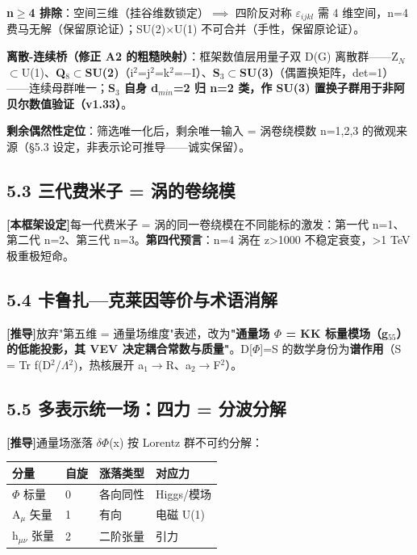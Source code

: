 \documentclass[12pt]{article}
\newcommand{\mtag}[1]{\textbf{[#1]}}
\newcommand{\up}[1]{\ensuremath{^{#1}}}
\newcommand{\down}[1]{\ensuremath{_{#1}}}
\begin{document}
\textbf{n\ensuremath{\geq}4 排除}：空间三维（挂谷维数锁定）\ensuremath{\implies} 四阶反对称 \ensuremath{\varepsilon}\down{ijkl} 需 4 维空间，n=4 费马无解（保留原论证）；SU(2)\ensuremath{\times}U(1) 不可合并（手性，保留原论证）。

\textbf{离散-连续桥（修正 A2 的粗糙映射）}：框架数值层用量子双 D(G) 离散群------Z\down{N}\ensuremath{\subset}U(1)、\textbf{Q\down{8}\ensuremath{\subset}SU(2)}（i\up{2}=j\up{2}=k\up{2}=\ensuremath{-}I）、\textbf{S\down{3}\ensuremath{\subset}SU(3)}（偶置换矩阵，det=1）------连续母群唯一；\textbf{S\down{3} 自身 d\down{min}=2 归 n=2 类，作 SU(3) 置换子群用于非阿贝尔数值验证（v1.33）}。

\textbf{剩余偶然性定位}：筛选唯一化后，剩余唯一输入 = 涡卷绕模数 n=1,2,3 的微观来源（\S{}5.3 设定，非表示论可推导------诚实保留）。

\subsection{5.3 三代费米子 = 涡的卷绕模}

\mtag{本框架设定}每一代费米子 = 涡的同一卷绕模在不同能标的激发：第一代 n=1、第二代 n=2、第三代 n=3。\textbf{第四代预言}：n=4 涡在 z>1000 不稳定衰变，>1 TeV 极重极短命。

\subsection{5.4 卡鲁扎---克莱因等价与术语消解}

\mtag{推导}放弃"第五维 = 通量场维度"表述，改为\textbf{"通量场 \ensuremath{\Phi} = KK 标量模场（g\down{55}）的低能投影，其 VEV 决定耦合常数与质量"}。D[\ensuremath{\Phi}]=S 的数学身份为\textbf{谱作用}（S = Tr f(D\up{2}/\ensuremath{\Lambda}\up{2})，热核展开 a\down{1}\ensuremath{\to}R、a\down{2}\ensuremath{\to}F\up{2}）。

\subsection{5.5 多表示统一场：四力 = 分波分解}

\mtag{推导}通量场涨落 \ensuremath{\delta}\ensuremath{\Phi}(x) 按 Lorentz 群不可约分解：

\begin{table}[htbp]
\centering
\small
\begin{tabularx}{\textwidth}{@{}lXXX@{}}
\toprule
分量 & 自旋 & 涨落类型 & 对应力 \\
\midrule
\ensuremath{\Phi} 标量 & 0 & 各向同性 & Higgs/模场 \\
A\down{\mu{}} 矢量 & 1 & 有向 & 电磁 U(1) \\
h\down{\mu{}\nu{}} 张量 & 2 & 二阶张量 & 引力 \\
\bottomrule
\end{tabularx}
\end{table}
\end{document}
